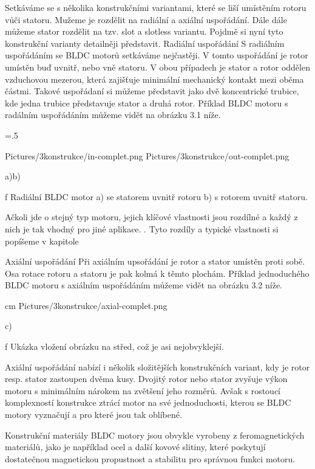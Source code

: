 Setkáváme se s několika konstrukčními variantami, které se liší umístěním rotoru vůči statoru. Mužeme je rozdělit na radiální a axiální uspořádání.
Dále dále můžeme stator rozdělit na tzv. slot a slotless variantu. Pojdmě si nyní tyto konstrukční varianty detailněji představit.   
\secc Radiální uspořádání
S radiálním uspořádáním se BLDC motorů setkáváme nejčastěji. V tomto uspořádání je rotor umístěn buď uvnitř, nebo vně statoru. 
V obou případech je stator a rotor oddělen vzduchovou mezerou, která zajišťuje minimální mechanický kontakt mezi oběma částmi. 
Takové uspořádaní si můžeme představit jako dvě koncentrické trubice, kde jedna trubice představuje stator a druhá rotor.
Příklad BLDC motoru s radálním uspořádáním můžeme vidět na obrázku 3.1 níže.

\medskip
\picw=.5\hsize
{} %
\centerline {\inspic Pictures/3konstrukce/in-complet.png \hfil\hfil \inspic Pictures/3konstrukce/out-complet.png }\nobreak
\centerline {a)\hfil\hfil b)}\nobreak\medskip
\caption/f Radiální BLDC motor a) se statorem uvnitř rotoru b) s rotorem uvnitř statoru.
 \medskip
 
Ačkoli jde o stejný typ motoru, jejich klíčové vlastnosti jsou rozdílné a každý z nich je tak vhodný pro jiné aplikace. 
. Tyto rozdíly a typické vlastnosti si popíšeme v kapitole %

\secc Axiální uspořádání
Při axiálním upsořádání je rotor a stator umístěn proti sobě. Osa rotace rotoru a statoru je pak kolmá k těmto plochám.
Příklad jednoduchého BLDC motoru s axiálním uspořádáním můžeme vidět na obrázku 3.2 níže. 

 \medskip
  cm \cinspic Pictures/3konstrukce/axial-complet.png 
 \centerline {c)}\nobreak\medskip
 \caption/f Ukázka vložení obrázku na střed, což je asi nejobvyklejší.
 \medskip
 
 Axiální uspořádání nabízí i několik složitějších konstrukčních variant, kdy je rotor resp. stator zastoupen dvěma kusy.
 Dvojitý rotor nebo stator zvyšuje výkon motoru s minimálním nárokem na zvětšení jeho rozměrů. Avšak s rostoucí komplexností konstrukce
 ztrácí motor na své jednoduchosti, kterou se BLDC motory vyznačují a pro které jsou tak oblíbené.     

\secc Konstrukční materiály
BLDC motory jsou obvykle vyrobeny z feromagnetických materiálů, jako je 
například ocel a další kovové slitiny, které poskytují dostatečnou magnetickou propustnost a stabilitu 
pro správnou funkci motoru.

